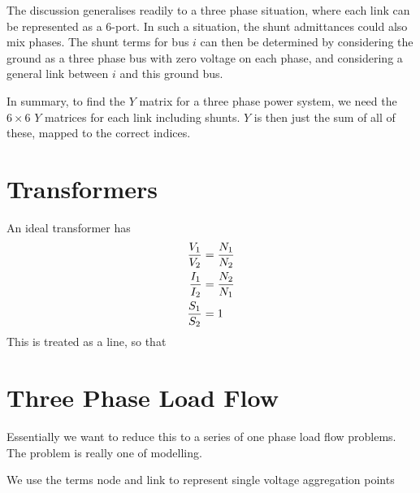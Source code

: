\documentclass[11pt]{article}
\begin{document}
The discussion generalises readily to a three phase situation, where each link can be represented as a 6-port. In such a situation, the shunt admittances could also mix phases. The shunt terms for bus $i$ can then be determined by considering the ground as a three phase bus with zero voltage on each phase, and considering a general link between $i$ and this ground bus.

In summary, to find the $Y$ matrix for a three phase power system, we need the $6\times6$ $Y$ matrices for each link including shunts. $Y$ is then just the sum of all of these, mapped to the correct indices.

\section{Transformers}
An ideal transformer has
\begin{align}
	\frac{V_1}{V_2} &= \frac{N_1}{N_2} \notag \\
	\frac{I_1}{I_2} &= \frac{N_2}{N_1} \notag \\
	\frac{S_1}{S_2} &= 1
\end{align}
This is treated as a line, so that 

\section{Three Phase Load Flow}
Essentially we want to reduce this to a series of one phase load flow problems. The problem is really one of modelling.

We use the terms node and link to represent single voltage aggregation points 
\end{document}
